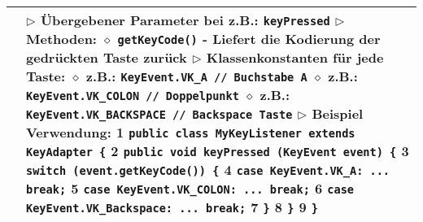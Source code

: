 \begin{longtable}{ | p{} p{} | }
	\makecell[l]{Klasse KeyEvent} & \makecell[l]{
	$\triangleright$ Übergebener Parameter bei z.B.: \texttt{keyPressed} \\
	$\triangleright$ Methoden: \\
	\hspace{0.4cm} $\diamond$ \texttt{getKeyCode()} \\
	\hspace{0.6cm} - Liefert die Kodierung der gedrückten Taste zurück \\
	$\triangleright$ Klassenkonstanten für jede Taste: \\
	\hspace{0.4cm} $\diamond$ z.B.: \texttt{KeyEvent.VK\_A // Buchstabe A} \\
	\hspace{0.4cm} $\diamond$ z.B.: \texttt{KeyEvent.VK\_COLON // Doppelpunkt} \\
	\hspace{0.4cm} $\diamond$ z.B.: \texttt{KeyEvent.VK\_BACKSPACE // Backspace Taste} \\
	$\triangleright$ Beispiel Verwendung: \\
	\hspace{0.4cm} 1 \hspace{0.1cm} \texttt{public class MyKeyListener extends KeyAdapter \{} \\
	\hspace{0.4cm} 2 \hspace{0.5cm} \texttt{public void keyPressed (KeyEvent event) \{} \\
	\hspace{0.4cm} 3 \hspace{0.9cm} \texttt{switch (event.getKeyCode()) \{}	\\
	\hspace{0.4cm} 4 \hspace{1.3cm} \texttt{case KeyEvent.VK\_A: ... break;} \\
	\hspace{0.4cm} 5 \hspace{1.3cm} \texttt{case KeyEvent.VK\_COLON: ... break;} \\
	\hspace{0.4cm} 6 \hspace{1.3cm} \texttt{case KeyEvent.VK\_Backspace: ... break;} \\
	\hspace{0.4cm} 7 \hspace{0.9cm} \texttt{\}} \\
	\hspace{0.4cm} 8 \hspace{0.5cm} \texttt{\}} \\
	\hspace{0.4cm} 9 \hspace{0.1cm} \texttt{\}}
	} \\ \hline


\end{longtable}
